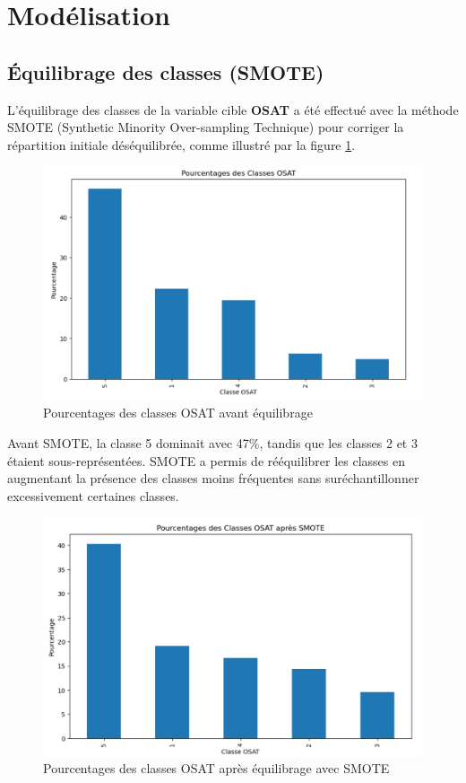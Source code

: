
\section{Modélisation}
\subsection{Équilibrage des classes (SMOTE)}

L'équilibrage des classes de la variable cible \textbf{OSAT} a été effectué avec la méthode SMOTE (Synthetic Minority Over-sampling Technique) pour corriger la répartition initiale déséquilibrée, comme illustré par la figure \ref{smote_avant}.

\begin{figure}[H]
    \centering
    \includegraphics[width=0.7\linewidth]{capture_sas_57.png}
    \caption{Pourcentages des classes OSAT avant équilibrage}
    \label{smote_avant}
\end{figure}

Avant SMOTE, la classe 5 dominait avec 47\%, tandis que les classes 2 et 3 étaient sous-représentées. SMOTE a permis de rééquilibrer les classes en augmentant la présence des classes moins fréquentes sans suréchantillonner excessivement certaines classes.

\begin{figure}[H]
    \centering
    \includegraphics[width=0.7\linewidth]{capture_sas_59.png}
    \caption{Pourcentages des classes OSAT après équilibrage avec SMOTE}
    \label{smote_aprés}
\end{figure}

